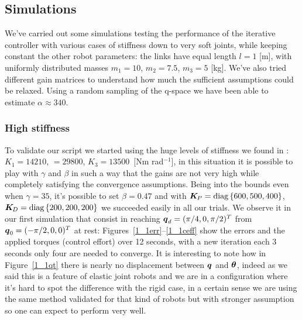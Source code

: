 \subsection{Simulations}
We've carried out some simulations testing the performance of the iterative controller with various cases of stiffness down to very soft joints, while keeping constant the other robot parameters: the links have equal length $l = 1$ [m], with uniformly distributed masses $m_1 = 10$, $m_2 = 7.5$, $m_3 = 5$ [kg]. We've also tried different gain matrices to understand how much the sufficient assumptions could be relaxed. Using a random sampling of the q-space we have been able to estimate $\alpha \approx 340$.
\subsubsection{High stiffness}
To validate our script we started using the huge levels of stiffness we found in \cite{simplepd}: $K_1 = 14210$, $ = 29800$, $K_3 = 13500 $~[Nm rad$^{-1}$], in this situation it is possible to play with $\gamma$ and $\beta $ in such a way that the gains are not very high while completely satisfying the convergence assumptions. Being into the bounds even when $\gamma = 35$, it's possible to set $\beta = 0.47$ and with $\boldsymbol{K}_{\!P} = \mbox{diag}\left\{600, 500, 400\right\}$,  $\boldsymbol{K}_{\!D}=\mbox{diag}\left\{200,200,200\right\}$ we succeeded easily in all our trials. We observe it in our first simulation that consist in reaching ${\boldsymbol{q}}_d=(\pi/4,0,\pi/2)^T$ from ${\boldsymbol{q}}_0=(-\pi/2,0,0)^T$ at rest: Figures~\ref{1_1err}--\ref{1_1ceff} show the errors and the applied torques (control effort) over 12 seconds, with a new iteration each 3 seconds only four are needed to converge. It is interesting to note how in Figure~\ref{1_1qt} there is nearly no displacement between ${\boldsymbol{q}}$ and $\boldsymbol{\theta}$, indeed as we said this is a feature of elastic joint robots and we are in a configuration where it's hard to spot the difference with the rigid case, in a certain sense we are using the same method validated for that kind of robots but with stronger assumption so one can expect to perform very well.
